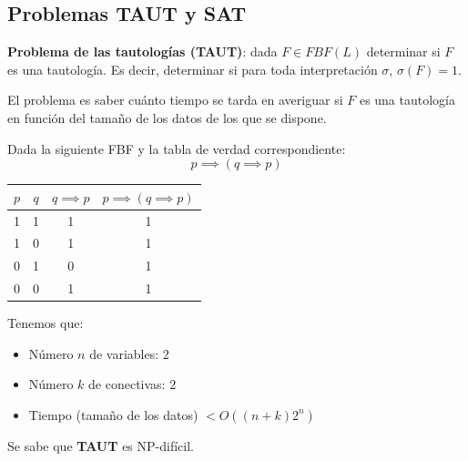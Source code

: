 \subsection{Problemas TAUT y SAT}
\begin{mdframed}
	\textbf{Problema de las tautologías (TAUT)}: dada $F\in FBF(L)$ determinar si $F$ es una tautología. Es decir, determinar si para toda interpretación $\sigma$, $\sigma (F)=1$.
\end{mdframed}

El problema es saber cuánto tiempo se tarda en averiguar si $F$ es una tautología en función del tamaño de los datos de los que se dispone.
\begin{example}
	Dada la siguiente FBF y la tabla de verdad correspondiente:
	$$p\implies(q\implies p)$$
	\begin{center}
		\begin{tabular}{|c|c|c|c|}
			\hline
			$p$ & $q$ & $q\implies p$ & $p\implies (q\implies p)$\\
			\hline
			1 & 1 & 1 & 1 \\
			\hline
			1 & 0 & 1 & 1 \\
			\hline
			0 & 1 & 0 & 1 \\
			\hline
			0 & 0 & 1 & 1 \\
			\hline
		\end{tabular}
	\end{center}
	Tenemos que:
		\begin{itemize}
			\item Número $n$ de variables: $2$
			\item Número $k$ de conectivas: $2$
			\item Tiempo (tamaño de los datos) $< O((n+k)2^n)$
		\end{itemize}
\end{example}

Se sabe que \textbf{TAUT} es NP-difícil.
